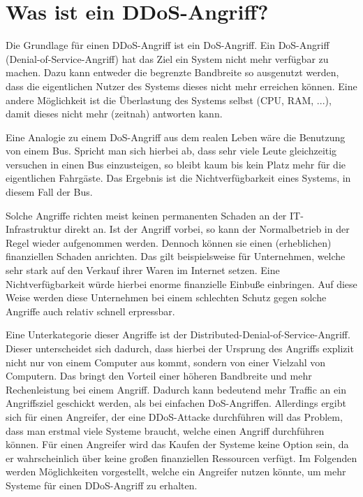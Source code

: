 \chapter{Was ist ein DDoS-Angriff?}
\label{chap:kapitel1}

Die Grundlage für einen DDoS-Angriff ist ein DoS-Angriff. Ein DoS-Angriff (Denial-of-Service-Angriff) hat das Ziel ein System nicht mehr verfügbar zu machen. Dazu kann entweder die begrenzte Bandbreite so ausgenutzt werden, dass die eigentlichen Nutzer des Systems dieses nicht mehr erreichen können. Eine andere Möglichkeit ist die Überlastung des Systems selbst (CPU, RAM, ...), damit dieses nicht mehr (zeitnah) antworten kann.

Eine Analogie zu einem DoS-Angriff aus dem realen Leben wäre die Benutzung von einem Bus. Spricht man sich hierbei ab, dass sehr viele Leute gleichzeitig versuchen in einen Bus einzusteigen, so bleibt kaum bis kein Platz mehr für die eigentlichen Fahrgäste. Das Ergebnis ist die Nichtverfügbarkeit eines Systems, in diesem Fall der Bus.

Solche Angriffe richten meist keinen permanenten Schaden an der IT-Infrastruktur direkt an. Ist der Angriff vorbei, so kann der Normalbetrieb in der Regel wieder aufgenommen werden. Dennoch können sie einen (erheblichen) finanziellen Schaden anrichten. Das gilt beispielsweise für Unternehmen, welche sehr stark auf den Verkauf ihrer Waren im Internet setzen. Eine Nichtverfügbarkeit würde hierbei enorme finanzielle Einbuße einbringen. Auf diese Weise werden diese Unternehmen bei einem schlechten Schutz gegen solche Angriffe auch relativ schnell erpressbar.

Eine Unterkategorie dieser Angriffe ist der Distributed-Denial-of-Service-Angriff. Dieser unterscheidet sich dadurch, dass hierbei der Ursprung des Angriffs explizit nicht nur von einem Computer aus kommt, sondern von einer Vielzahl von Computern. Das bringt den Vorteil einer höheren Bandbreite und mehr Rechenleistung bei einem Angriff. Dadurch kann bedeutend mehr Traffic an ein Angriffsziel geschickt werden, als bei einfachen DoS-Angriffen. Allerdings ergibt sich für einen Angreifer, der eine DDoS-Attacke durchführen will das Problem, dass man erstmal viele Systeme braucht, welche einen Angriff durchführen können. Für einen Angreifer wird das Kaufen der Systeme keine Option sein, da er wahrscheinlich über keine großen finanziellen Ressourcen verfügt. Im Folgenden werden Möglichkeiten vorgestellt, welche ein Angreifer nutzen könnte, um mehr Systeme für einen DDoS-Angriff zu erhalten. 

